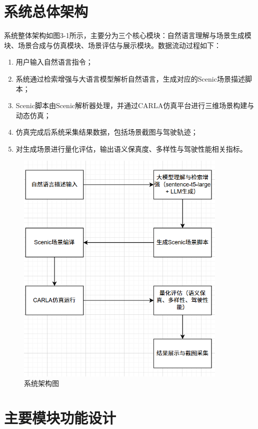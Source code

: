 \section{系统总体架构}
系统整体架构如图3-1所示，主要分为三个核心模块：自然语言理解与场景生成模块、场景合成与仿真模块、场景评估与展示模块。数据流动过程如下：
\begin{enumerate}
	\item 用户输入自然语言指令；
	\item 系统通过检索增强与大语言模型解析自然语言，生成对应的Scenic场景描述脚本；
	\item Scenic脚本由Scenic解析器处理，并通过CARLA仿真平台进行三维场景构建与动态仿真；
	\item 仿真完成后系统采集结果数据，包括场景截图与驾驶轨迹；
	\item 对生成场景进行量化评估，输出语义保真度、多样性与驾驶性能相关指标。
\end{enumerate}
\begin{figure}[H]
	\centering
	\includegraphics[width=0.9\textwidth]{../images/系统架构图.png} 
	\caption{系统架构图}
	\label{fig:system_architecture} %
\end{figure}

\section{主要模块功能设计}
